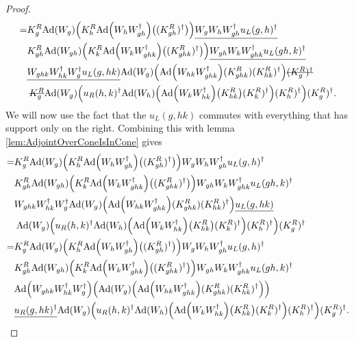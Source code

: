 \documentclass[12pt,a4paper,twoside]{article}
\numberwithin{equation}{section}
\begin{document}
\begin{proof}
	\begin{align}
		=&K_g^R\Ad{W_g}\left(K_h^R\Ad{W_hW_{gh}^\dagger}\left((K_{gh}^R)^\dagger\right)\right)\underline{W_gW_hW_{gh}^\dagger u_L(g,h)^\dagger}\\
		\nonumber
		&K_{gh}^R\Ad{W_{gh}}\left(K_k^R\Ad{W_kW_{ghk}^\dagger}\left((K_{ghk}^R)^\dagger\right)\right) \underline{W_{gh}W_kW_{ghk}^\dagger u_L(gh,k)^\dagger}\\
		\nonumber
		&\underline{W_{ghk}W_{hk}^\dagger W_{g}^\dagger u_L(g,hk)} \Ad{W_g}\left( \Ad{W_{hk}W_{ghk}^\dagger}(K^R_{ghk})(K^R_{hk})^{\dagger} \right)\stkout{(K^R_g)^\dagger}\\
		\nonumber
		&\:\stkout{K^R_g}\Ad{W_g}\left(u_R(h,k)^\dagger \Ad{W_h}\left(\Ad{W_kW_{hk}^\dagger}\left(K_{hk}^R\right)(K^R_k)^\dagger\right)(K^R_h)^\dagger\right)(K^R_g)^\dagger.
	\end{align}
	We will now use the fact that the $u_L(g,hk)$ commutes with everything that has support only on the right. Combining this with lemma \ref{lem:AdjointOverConeIsInCone} gives
	\begin{align}
		=&K_g^R\Ad{W_g}\left(K_h^R\Ad{W_hW_{gh}^\dagger}\left((K_{gh}^R)^\dagger\right)\right)W_gW_hW_{gh}^\dagger u_L(g,h)^\dagger\\
		\nonumber
		&K_{gh}^R\Ad{W_{gh}}\left(K_k^R\Ad{W_kW_{ghk}^\dagger}\left((K_{ghk}^R)^\dagger\right)\right) W_{gh}W_kW_{ghk}^\dagger u_L(gh,k)^\dagger\\
		\nonumber
		&W_{ghk}W_{hk}^\dagger W_{g}^\dagger \Ad{W_g}\left( \Ad{W_{hk}W_{ghk}^\dagger}(K^R_{ghk})(K^R_{hk})^{\dagger} \right)\underline{u_L(g,hk)}\\
		\nonumber
		&\:\Ad{W_g}\left(u_R(h,k)^\dagger \Ad{W_h}\left(\Ad{W_kW_{hk}^\dagger}\left(K_{hk}^R\right)(K^R_k)^\dagger\right)(K^R_h)^\dagger\right)(K^R_g)^\dagger\\
		=&K_g^R\Ad{W_g}\left(K_h^R\Ad{W_hW_{gh}^\dagger}\left((K_{gh}^R)^\dagger\right)\right)W_gW_hW_{gh}^\dagger u_L(g,h)^\dagger\\
		\nonumber
		&K_{gh}^R\Ad{W_{gh}}\left(K_k^R\Ad{W_kW_{ghk}^\dagger}\left((K_{ghk}^R)^\dagger\right)\right) W_{gh}W_kW_{ghk}^\dagger u_L(gh,k)^\dagger\\
		\nonumber
		&\Ad{W_{ghk}W_{hk}^\dagger W_{g}^\dagger}  \left(\Ad{W_g}\left( \Ad{W_{hk}W_{ghk}^\dagger}(K^R_{ghk})(K^R_{hk})^{\dagger} \right)\right)\\
		\nonumber
		&\underline{u_R(g,hk)^\dagger}\Ad{W_g}\left(u_R(h,k)^\dagger \Ad{W_h}\left(\Ad{W_kW_{hk}^\dagger}\left(K_{hk}^R\right)(K^R_k)^\dagger\right)(K^R_h)^\dagger\right)(K^R_g)^\dagger.

\end{align}
\end{proof}
\end{document}
